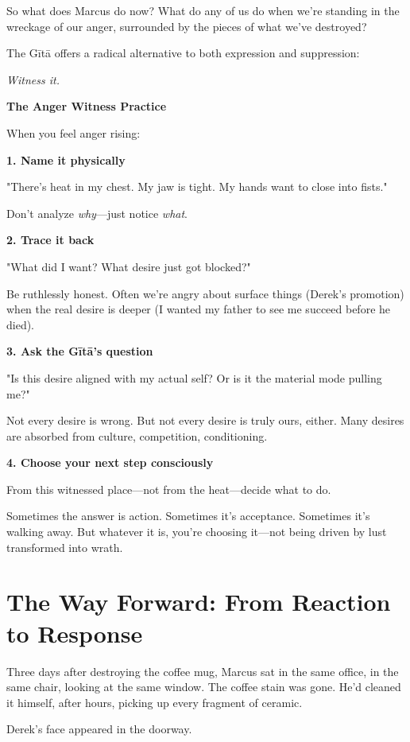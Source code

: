 \documentclass[11pt,twoside]{book}
\begin{document}
So what does Marcus do now? What do any of us do when we're standing in the wreckage of our anger, surrounded by the pieces of what we've destroyed?

The Gītā offers a radical alternative to both expression and suppression:

\textit{Witness it.}

\begin{practicebox}
\textbf{The Anger Witness Practice}

When you feel anger rising:

\textbf{1. Name it physically}

"There's heat in my chest. My jaw is tight. My hands want to close into fists."

Don't analyze \textit{why}—just notice \textit{what}.

\textbf{2. Trace it back}

"What did I want? What desire just got blocked?"

Be ruthlessly honest. Often we're angry about surface things (Derek's promotion) when the real desire is deeper (I wanted my father to see me succeed before he died).

\textbf{3. Ask the Gītā's question}

"Is this desire aligned with my actual self? Or is it the material mode pulling me?"

Not every desire is wrong. But not every desire is truly ours, either. Many desires are absorbed from culture, competition, conditioning.

\textbf{4. Choose your next step consciously}

From this witnessed place—not from the heat—decide what to do.

Sometimes the answer is action. Sometimes it's acceptance. Sometimes it's walking away. But whatever it is, you're choosing it—not being driven by lust transformed into wrath.
\end{practicebox}

\section*{The Way Forward: From Reaction to Response}

Three days after destroying the coffee mug, Marcus sat in the same office, in the same chair, looking at the same window. The coffee stain was gone. He'd cleaned it himself, after hours, picking up every fragment of ceramic.

Derek's face appeared in the doorway.
\end{document}
